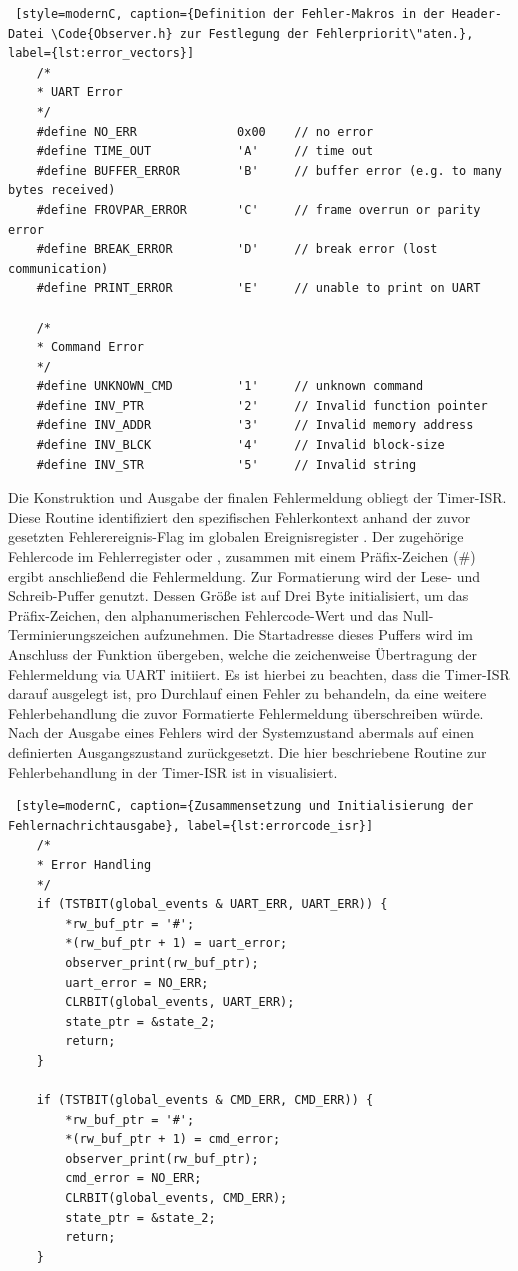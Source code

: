 \newpage
\begin{lstlisting} [style=modernC, caption={Definition der Fehler-Makros in der Header-Datei \Code{Observer.h} zur Festlegung der Fehlerpriorit\"aten.}, label={lst:error_vectors}]
	/*
	* UART Error
	*/
	#define NO_ERR              0x00    // no error
	#define TIME_OUT            'A'     // time out
	#define BUFFER_ERROR        'B'     // buffer error (e.g. to many bytes received)
	#define FROVPAR_ERROR       'C'     // frame overrun or parity error
	#define BREAK_ERROR         'D'     // break error (lost communication)
	#define PRINT_ERROR         'E'     // unable to print on UART
	
	/*
	* Command Error
	*/
	#define UNKNOWN_CMD         '1'     // unknown command
	#define INV_PTR             '2'     // Invalid function pointer
	#define INV_ADDR            '3'     // Invalid memory address
	#define INV_BLCK            '4'     // Invalid block-size
	#define INV_STR             '5'     // Invalid string
\end{lstlisting}

Die Konstruktion und Ausgabe der finalen Fehlermeldung obliegt der Timer-ISR. Diese Routine identifiziert den spezifischen Fehlerkontext anhand der zuvor gesetzten Fehlerereignis-Flag im globalen Ereignisregister . Der zugeh\"orige Fehlercode im Fehlerregister  oder , zusammen mit einem Pr\"afix-Zeichen (\glqq{}\#\grqq{}) ergibt anschlie{\ss}end die Fehlermeldung. Zur Formatierung wird der Lese- und Schreib-Puffer  genutzt. Dessen Gr\"o{\ss}e ist auf Drei Byte initialisiert, um das Pr\"afix-Zeichen, den alphanumerischen Fehlercode-Wert und das Null-Terminierungszeichen aufzunehmen. Die Startadresse dieses Puffers wird im Anschluss der Funktion  \"ubergeben, welche die zeichenweise \"Ubertragung der Fehlermeldung via UART initiiert. Es ist hierbei zu beachten, dass die Timer-ISR darauf ausgelegt ist, pro Durchlauf einen Fehler zu behandeln, da eine weitere Fehlerbehandlung die zuvor Formatierte Fehlermeldung \"uberschreiben w\"urde. Nach der Ausgabe eines Fehlers wird der Systemzustand abermals auf einen definierten Ausgangszustand zur\"uckgesetzt. Die hier beschriebene Routine zur Fehlerbehandlung in der Timer-ISR ist in  visualisiert.

\newpage
\begin{lstlisting} [style=modernC, caption={Zusammensetzung und Initialisierung der Fehlernachrichtausgabe}, label={lst:errorcode_isr}]
    /*
    * Error Handling
    */
	if (TSTBIT(global_events & UART_ERR, UART_ERR)) {
		*rw_buf_ptr = '#';
		*(rw_buf_ptr + 1) = uart_error;
		observer_print(rw_buf_ptr);
		uart_error = NO_ERR;
		CLRBIT(global_events, UART_ERR);
		state_ptr = &state_2;
		return;
	}
	
	if (TSTBIT(global_events & CMD_ERR, CMD_ERR)) {
		*rw_buf_ptr = '#';
		*(rw_buf_ptr + 1) = cmd_error;
		observer_print(rw_buf_ptr);
		cmd_error = NO_ERR;
		CLRBIT(global_events, CMD_ERR);
		state_ptr = &state_2;
		return;
	}
\end{lstlisting}

